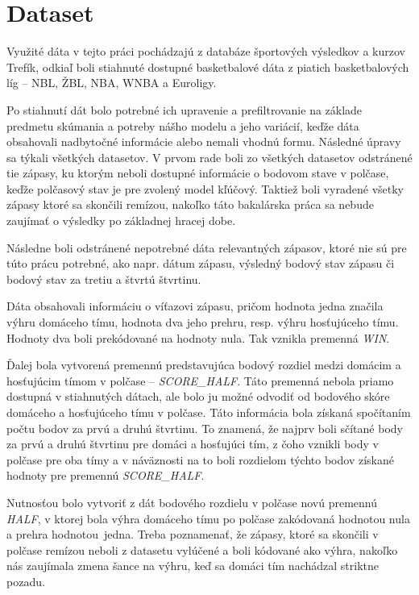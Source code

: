 \documentclass[
  digital, %
  twoside, %
  notable,   %
  lof,     %
  lot,     %
]{fithesis3}
\begin{document}
		\section{Dataset}
		Využité dáta v tejto práci pochádzajú z databáze športových výsledkov a kurzov Trefík, odkiaľ boli stiahnuté dostupné basketbalové dáta z piatich basketbalových líg – NBL, ŽBL, NBA, WNBA a Euroligy. \parencite{trefik}
		
		Po stiahnutí dát bolo potrebné ich upravenie a prefiltrovanie na základe predmetu skúmania a potreby nášho modelu a jeho variácií, keďže dáta obsahovali nadbytočné informácie alebo nemali vhodnú formu. Následné úpravy sa týkali všetkých datasetov. V prvom rade boli zo všetkých datasetov odstránené tie zápasy, ku ktorým neboli dostupné informácie o bodovom stave v polčase, keďže polčasový stav je pre zvolený model kľúčový. Taktiež boli vyradené všetky zápasy ktoré sa skončili remízou, nakoľko táto bakalárska práca sa nebude zaujímať o výsledky po základnej hracej dobe. 
		
		Následne boli odstránené nepotrebné dáta relevantných zápasov, ktoré nie sú pre túto prácu potrebné, ako napr. dátum zápasu, výsledný bodový stav zápasu či bodový stav za tretiu a štvrtú štvrtinu.
		
		Dáta obsahovali informáciu o víťazovi zápasu, pričom hodnota jedna značila výhru domáceho tímu, hodnota dva jeho prehru, resp. výhru hosťujúceho tímu. Hodnoty dva boli prekódované na hodnoty nula. Tak vznikla premenná \textit{WIN}.
		
		Ďalej bola vytvorená premennú predstavujúca bodový rozdiel medzi domácim a hosťujúcim tímom v polčase –  \textit{SCORE\_HALF}. Táto premenná nebola priamo dostupná v stiahnutých dátach, ale bolo ju možné  odvodiť od  bodového skóre domáceho a hosťujúceho tímu v polčase. Táto informácia bola získaná spočítaním počtu bodov za prvú a druhú štvrtinu. To znamená, že najprv boli sčítané body za prvú a druhú štvrtinu pre domáci a hosťujúci tím, z čoho vznikli body v polčase pre oba tímy a v náväznosti na to boli rozdielom týchto bodov získané hodnoty pre premennú \textit{SCORE\_HALF}. 
		
		Nutnosťou bolo vytvoriť z dát bodového rozdielu v polčase novú premennú \textit{HALF}, v ktorej bola výhra domáceho tímu po polčase zakódovaná hodnotou nula a prehra hodnotou~jedna. Treba poznamenať, že zápasy, ktoré sa skončili v polčase remízou neboli z datasetu vylúčené a boli kódované ako výhra, nakoľko nás zaujímala zmena šance na výhru, keď sa domáci tím nachádzal striktne pozadu.
		
\end{document}
